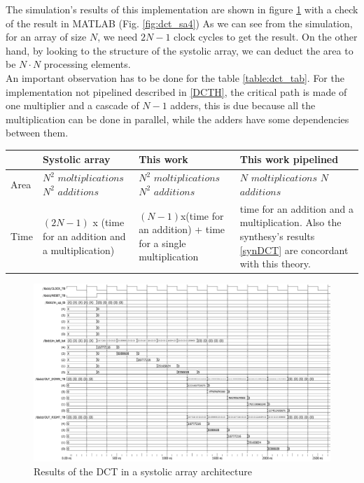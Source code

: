   The simulation's results of this implementation are shown in figure \ref{fig:dct_sa3} with a check of the result in MATLAB (Fig. \ref{fig:dct_sa4})
  As we can see from the simulation, for an array of size $ N $, we need $ 2N-1 $ clock cycles to get the result.
  On the other hand, by looking to the structure of the systolic array, we can deduct the area to be $ N \cdot N $ processing elements.\\
  An important observation has to be done for the table \ref{table:dct_tab}.
  For the implementation not pipelined described in \ref{DCTH}, the critical path is made of one multiplier and a cascade of $ N-1 $ adders, this is due because all the multiplication can be done in parallel, while the adders have some dependencies between them.
   \begin{center}
   	\begin{tabular}{ | p{1.3cm} | >{\centering\arraybackslash}p{4cm} | >{\centering\arraybackslash}p{4cm} | >{\centering\arraybackslash}p{4cm} |}
   		\hline
   		\label{table:dct_tab} & Systolic array & This work & This work pipelined\\
   		\hline
   		Area & $ N^{2}$ $ moltiplications $ \qquad \qquad$N^{2}$ $ additions $  & $N^{2}
   $ $moltiplications$ \qquad \qquad $ N^{2} $ $additions$ & $ N$ $ moltiplications$ \qquad \qquad $ N$ $ additions$\\
   		\hline
   		Time & $ (2N-1) $ x (time for an addition and a multiplication)&
   		
   		$ (N-1) $x(time for an addition) + time for a single multiplication & time for an addition and a multiplication. Also the synthesy's results \ref{synDCT} are concordant with this theory.
   		 \\
   		\hline
   		
   	\end{tabular}
   \end{center}
        \begin{figure}[h!]
        	\centering
        	\includegraphics[width=\textwidth]{imm/dct/dct_sa3.png}  
        	\caption{Results of the DCT in a systolic array architecture} 
        	\label{fig:dct_sa3}
        \end{figure}
        
